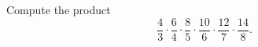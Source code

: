 Compute the product
\[
\dfrac{4}{3}\cdot\dfrac{6}{4}\cdot\dfrac{8}{5}\cdot\dfrac{10}{6}\cdot\dfrac{12}{7}\cdot\dfrac{14}{8}.
\]
